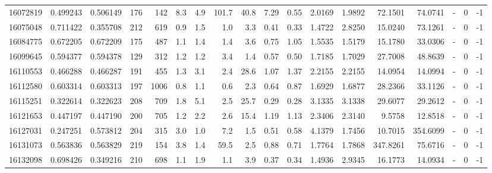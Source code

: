 \begin{tabular}{rrrrrrrrrrrrrrrlrr}
  16072819 & 0.499243 &   0.506149 &  176 &  142 &      8.3 &      4.9 &   101.7 &     40.8 &       7.29 &        0.55 &  2.0169 &  1.9892 &   72.1501 &   74.0741 &             - &        0 &         -1 \\
  16075048 & 0.711422 &   0.355708 &  212 &  619 &      0.9 &      1.5 &     1.0 &      3.3 &       0.41 &        0.33 &  1.4722 &  2.8250 &   15.0240 &   73.1261 &             - &        0 &         -1 \\
  16084775 & 0.672205 &   0.672209 &  175 &  487 &      1.1 &      1.4 &     1.4 &      3.6 &       0.75 &        1.05 &  1.5535 &  1.5179 &   15.1780 &   33.0306 &             - &        0 &         -1 \\
  16099645 & 0.594377 &   0.594378 &  129 &  312 &      1.2 &      1.2 &     3.4 &      1.4 &       0.57 &        0.50 &  1.7185 &  1.7029 &   27.7008 &   48.8639 &             - &        0 &         -1 \\
  16110553 & 0.466288 &   0.466287 &  191 &  455 &      1.3 &      3.1 &     2.4 &     28.6 &       1.07 &        1.37 &  2.2155 &  2.2155 &   14.0954 &   14.0994 &             - &        0 &         -1 \\
  16112580 & 0.603314 &   0.603313 &  197 & 1006 &      0.8 &      1.1 &     0.6 &      2.3 &       0.64 &        0.87 &  1.6929 &  1.6877 &   28.2366 &   33.1126 &             - &        0 &         -1 \\
  16115251 & 0.322614 &   0.322623 &  208 &  709 &      1.8 &      5.1 &     2.5 &     25.7 &       0.29 &        0.28 &  3.1335 &  3.1338 &   29.6077 &   29.2612 &             - &        0 &         -1 \\
  16121653 & 0.447197 &   0.447190 &  200 &  705 &      1.2 &      2.2 &     2.6 &     15.4 &       1.19 &        1.13 &  2.3406 &  2.3140 &    9.5758 &   12.8518 &             - &        0 &         -1 \\
  16127031 & 0.247251 &   0.573812 &  204 &  315 &      3.0 &      1.0 &     7.2 &      1.5 &       0.51 &        0.58 &  4.1379 &  1.7456 &   10.7015 &  354.6099 &             - &        0 &         -1 \\
  16131073 & 0.563836 &   0.563829 &  219 &  154 &      3.8 &      1.4 &    59.5 &      2.5 &       0.88 &        0.71 &  1.7764 &  1.7868 &  347.8261 &   75.6716 &             - &        0 &         -1 \\
  16132098 & 0.698426 &   0.349216 &  210 &  698 &      1.1 &      1.9 &     1.1 &      3.9 &       0.37 &        0.34 &  1.4936 &  2.9345 &   16.1773 &   14.0934 &             - &        0 &         -1 \\

\end{tabular}
